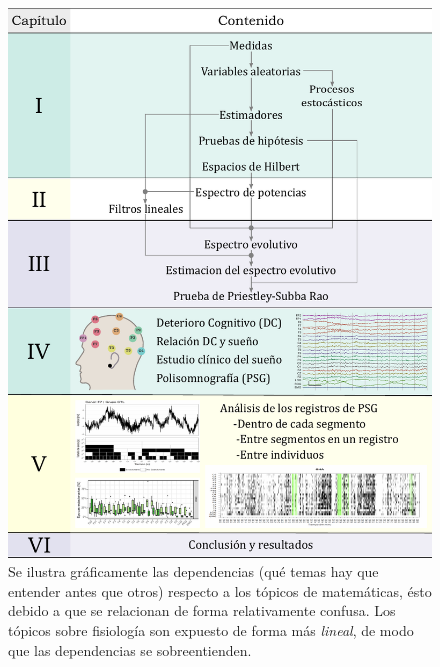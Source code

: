 \begin{figure}
\centering
\includegraphics[width=.9\textwidth]{./estructura_texto_v2.pdf}
\caption[Estructura de la tesis]{Se ilustra gráficamente las dependencias (qué temas hay que entender antes que otros) respecto a los tópicos de matemáticas, ésto debido a que se relacionan de forma relativamente confusa. Los tópicos sobre fisiología son expuesto de forma más \textit{lineal}, de modo que las dependencias se sobreentienden.}
\label{intro:estructura}
\end{figure}


